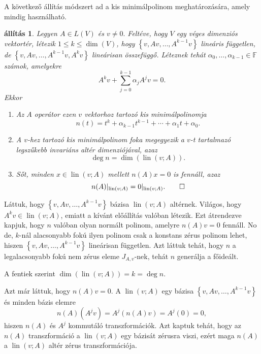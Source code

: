 \documentclass[9pt, a4paper, showtrims]{memoir}
\makeatletter
\renewenvironment{proof}[1][\proofname]
    {\par\pushQED{\qed}%
    \normalfont \topsep6\p@\@plus6\p@\relax
    \trivlist
    \item[\hskip\labelsep
        \itshape
    #1\@addpunct{:}]\ignorespaces}
    {\popQED\endtrivlist\@endpefalse}
\theoremstyle{plain}
\newtheorem{proposition}{állítás}[chapter]
\theoremstyle{remark}
\theoremstyle{definition}
\DeclareMathOperator{\lin}{lin}
\makeatother
\begin{document}
A következő állítás módszert ad a kis minimálpolinom meghatározására,
amely mindig használható.
\begin{proposition}
	Legyen $A\in L\left( V \right)$ és $v\neq 0.$
	Feltéve, hogy $V$ egy véges dimenziós vektortér,
	létezik $1\leq k \leq \dim(V)$,
	hogy
	$\left\{ v,Av,\ldots,A^{k-1}v \right\}$ lineáris független,
	de $\left\{ v,Av,\ldots,A^{k-1}v,A^{k}v \right\}$ lineárisan összefüggő.
	Léteznek tehát $\alpha_0,\ldots,\alpha_{k-1}\in\mathbb{F}$
	számok, amelyekre
	\[
		A^{k}v+\sum_{j=0}^{k-1}\alpha_jA^{j}v=0.
	\]
    Ekkor
    \begin{enumerate}
        \item 
	    Az $A$ operátor ezen $v$ vektorhoz tartozó kis minimálpolinomja
    	\[
	    	n\left( t \right)=
            t^k+\alpha_{k-1}t^{k-1}+\cdots+\alpha_1t+\alpha_0.
    	\]
        \item
        A $v$-hez tartozó kis minimálpolinom foka megegyezik a $v$-t tartalmazó legszűkebb invariáns altér dimenziójával, azaz 
        \[
            \deg n=\dim\left( \lin\left( v;A \right) \right).
        \]
        \item
        Sőt, minden $x\in\lin\left( v;A \right)$ mellett $n\left( A \right)x=0$ is fennáll, azaz
        \[
            n(A)|_{\lin\left( v;A \right)}=0|_{\lin\left( v;A \right)}.\qedhere
        \]
    \end{enumerate}
\end{proposition}
\begin{proof}
	Láttuk, hogy $\left\{ v,Av,\ldots,A^{k-1}v \right\}$ bázisa $\lin\left( v;A \right)$ altérnek.
	Világos, hogy $A^kv\in\lin\left( v;A \right)$, emiatt a kívánt előállítás valóban létezik.
	Ezt átrendezve kapjuk, hogy $n$ valóban olyan normált polinom, amelyre $n\left( A \right)v=0$ fennáll.
	No de, $k$-nál alacsonyabb fokú ilyen polinom csak a konstans zérus polinom lehet,
	hiszen $\left\{ v,Av,\ldots,A^{k-1}v \right\}$ lineárisan független.
	Azt láttuk tehát, hogy $n$ a legalacsonyabb fokú nem zérus eleme $J_{A,v}$-nek,
	tehát $n$ generálja a főideált.

    A fentiek szerint $\dim\left( \lin\left( v;A \right) \right)=k=\deg n$.

    Azt már láttuk, hogy $n\left( A \right)v=0$. 
    A $\lin\left( v;A \right)$ egy bázisa $\left\{ v,Av,\ldots,A^{k-1}v \right\}$ és minden bázis elemre
    \[
        n\left( A \right)\left( A^jv \right)=A^j\left( n\left( A \right)v \right)=A^j\left( 0 \right)=0,
    \]
    hiszen $n\left( A \right)$ és $A^j$ kommutáló transzformációk.
    Azt kaptuk tehát, hogy az $n\left( A \right)$ transzformáció a $\lin\left( v;A \right)$ egy bázisát zérusra viszi,
    ezért maga $n\left( A \right)$ a $\lin\left( v;A \right)$ altér zérus transzformációja.
\end{proof}
\end{document}

